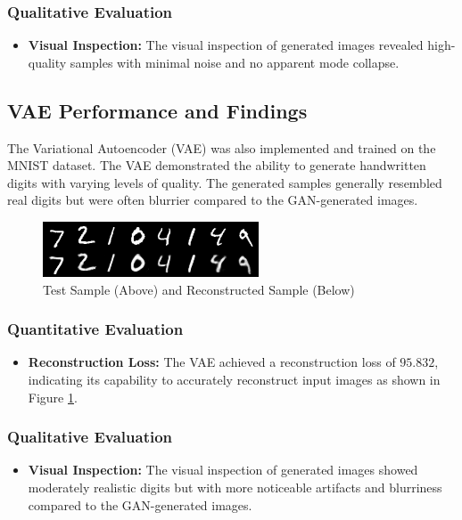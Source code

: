 \documentclass{article}
\begin{document}
\subsubsection{Qualitative Evaluation}
\begin{itemize}
    \item \textbf{Visual Inspection:} The visual inspection of generated images revealed high-quality samples with minimal noise and no apparent mode collapse.
\end{itemize}

\subsection{VAE Performance and Findings}
The Variational Autoencoder (VAE) was also implemented and trained on the MNIST dataset. The VAE demonstrated the ability to generate handwritten digits with varying levels of quality. The generated samples generally resembled real digits but were often blurrier compared to the GAN-generated images.

\begin{figure}[ht]
\vskip 0.2in
\begin{center}
\centerline{\includegraphics[width=\columnwidth]{images/vae_reconstruction.png}}
\caption{Test Sample (Above) and Reconstructed Sample (Below)}
\label{vae-reconstruction}
\end{center}
\vskip -0.2in
\end{figure}

\subsubsection{Quantitative Evaluation}
\begin{itemize}
    \item \textbf{Reconstruction Loss:} The VAE achieved a reconstruction loss of $95.832$, indicating its capability to accurately reconstruct input images as shown in Figure \ref{vae-reconstruction}.
\end{itemize}

\subsubsection{Qualitative Evaluation}
\begin{itemize}
    \item \textbf{Visual Inspection:} The visual inspection of generated images showed moderately realistic digits but with more noticeable artifacts and blurriness compared to the GAN-generated images.
\end{itemize}
\end{document}
